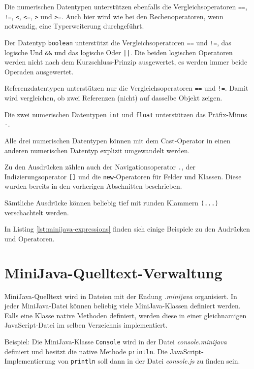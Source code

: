 Die numerischen Datentypen unterstützen ebenfalls die Vergleichsoperatoren \lstinline{==}, \lstinline{!=}, \mbox{\lstinline{<},} \lstinline{<=}, \lstinline{>} und \lstinline{>=}. Auch hier wird wie bei den Rechenoperatoren, wenn notwendig, eine Typerweiterung durchgeführt.

Der Datentyp \lstinline{boolean} unterstützt die Vergleichsoperatoren \lstinline{==} und \lstinline{!=}, das logische Und \lstinline{&&} und das logische Oder \lstinline{||}. Die beiden logischen Operatoren werden nicht nach dem Kurzschluss-Prinzip ausgewertet, es werden immer beide Operaden ausgewertet.

Referenzdatentypen unterstützen nur die Vergleichsoperatoren \lstinline{==} und \lstinline{!=}. Damit wird vergleichen, ob zwei Referenzen (nicht) auf dasselbe Objekt zeigen.

Die zwei numerischen Datentypen \lstinline{int} und \lstinline{float} unterstützen das Präfix-Minus \lstinline{-}.

Alle drei numerischen Datentypen können mit dem Cast-Operator in einen anderen numerischen Datentyp explizit umgewandelt werden.

Zu den Ausdrücken zählen auch der Navigationsoperator \lstinline{.}, der Indizierungsoperator \lstinline{[]} und die \lstinline{new}-Operatoren für Felder und Klassen. Diese wurden bereits in den vorherigen Abschnitten beschrieben.

Sämtliche Ausdrücke können beliebig tief mit runden Klammern \lstinline{(...)} verschachtelt werden.

In Listing \ref{lst:minijava-expressions} finden sich einige Beispiele zu den Audrücken und Operatoren.

\pagebreak


\section{MiniJava-Quelltext-Verwaltung}

MiniJava-Quelltext wird in Dateien mit der Endung \emph{.minijava} organisiert. In jeder MiniJava-Datei können beliebig viele MiniJava-Klassen definiert werden. Falls eine Klasse native Methoden definiert, werden diese in einer gleichnamigen JavaScript-Datei im selben Verzeichnis implementiert.

Beispiel: Die MiniJava-Klasse \lstinline{Console} wird in der Datei \emph{console.minijava} definiert und besitzt die native Methode \lstinline{println}. Die JavaScript-Implementierung von \lstinline{println} soll dann in der Datei \emph{console.js} zu finden sein.

